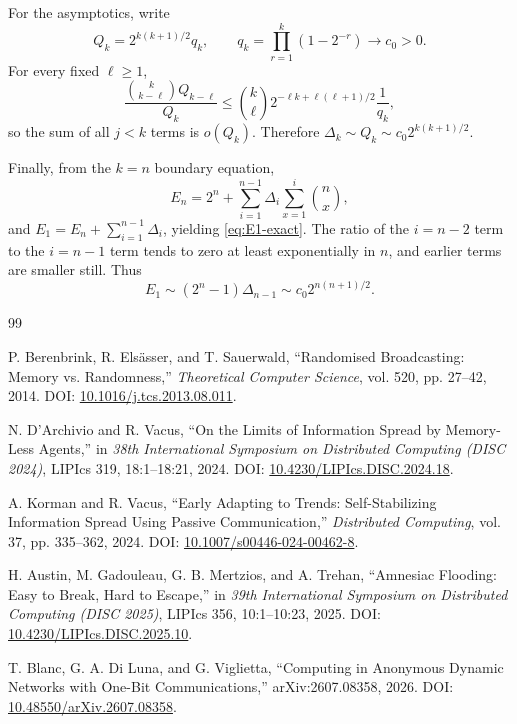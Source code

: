 \documentclass[11pt]{article}
\begin{document}
For the asymptotics, write
\[
  Q_k
  =2^{k(k+1)/2}q_k,
  \qquad
  q_k=\prod_{r=1}^{k}(1-2^{-r})\to c_0>0.
\]
For every fixed $\ell\ge1$,
\[
  \frac{\binom{k}{k-\ell}Q_{k-\ell}}{Q_k}
  \le
  \binom{k}{\ell}
  2^{-\ell k+\ell(\ell+1)/2}
  \frac{1}{q_k},
\]
so the sum of all $j<k$ terms is $o(Q_k)$. Therefore $\Delta_k\sim Q_k\sim c_0 2^{k(k+1)/2}$.

Finally, from the $k=n$ boundary equation,
\[
  E_n
  =2^n+
   \sum_{i=1}^{n-1}\Delta_i\sum_{x=1}^{i}\binom{n}{x},
\]
and $E_1=E_n+\sum_{i=1}^{n-1}\Delta_i$, yielding \eqref{eq:E1-exact}. The ratio of the $i=n-2$ term to the $i=n-1$ term tends to zero at least exponentially in $n$, and earlier terms are smaller still. Thus
\[
  E_1\sim (2^n-1)\Delta_{n-1}
  \sim c_0 2^{n(n+1)/2}.
\]

\small
\begin{thebibliography}{99}

P. Berenbrink, R. Els{\"a}sser, and T. Sauerwald,
``Randomised Broadcasting: Memory vs. Randomness,''
\emph{Theoretical Computer Science}, vol. 520, pp. 27--42, 2014.
DOI: \href{https://doi.org/10.1016/j.tcs.2013.08.011}{10.1016/j.tcs.2013.08.011}.

N. D'Archivio and R. Vacus,
``On the Limits of Information Spread by Memory-Less Agents,''
in \emph{38th International Symposium on Distributed Computing (DISC 2024)},
LIPIcs 319, 18:1--18:21, 2024.
DOI: \href{https://doi.org/10.4230/LIPIcs.DISC.2024.18}{10.4230/LIPIcs.DISC.2024.18}.

A. Korman and R. Vacus,
``Early Adapting to Trends: Self-Stabilizing Information Spread Using Passive Communication,''
\emph{Distributed Computing}, vol. 37, pp. 335--362, 2024.
DOI: \href{https://doi.org/10.1007/s00446-024-00462-8}{10.1007/s00446-024-00462-8}.

H. Austin, M. Gadouleau, G. B. Mertzios, and A. Trehan,
``Amnesiac Flooding: Easy to Break, Hard to Escape,''
in \emph{39th International Symposium on Distributed Computing (DISC 2025)},
LIPIcs 356, 10:1--10:23, 2025.
DOI: \href{https://doi.org/10.4230/LIPIcs.DISC.2025.10}{10.4230/LIPIcs.DISC.2025.10}.

T. Blanc, G. A. Di Luna, and G. Viglietta,
``Computing in Anonymous Dynamic Networks with One-Bit Communications,''
arXiv:2607.08358, 2026.
DOI: \href{https://doi.org/10.48550/arXiv.2607.08358}{10.48550/arXiv.2607.08358}.


\end{thebibliography}
\end{document}
